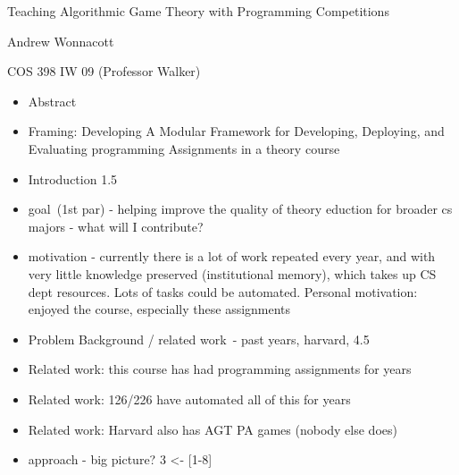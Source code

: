 \documentclass[]{article}
\date{}
\providecommand{\tightlist}{%
  \setlength{\itemsep}{0pt}\setlength{\parskip}{0pt}}
\begin{document}
{Teaching Algorithmic Game Theory with Programming Competitions}

{Andrew Wonnacott}

{COS 398 IW 09 (Professor Walker)}

\begin{itemize}
\tightlist
\item
  {Abstract}
\end{itemize}

\begin{itemize}
\tightlist
\item
  {Framing: Developing A Modular Framework for Developing, Deploying,
  and Evaluating programming Assignments in a theory course}
\end{itemize}

\begin{itemize}
\tightlist
\item
  {Introduction 1.5}
\end{itemize}

\begin{itemize}
\tightlist
\item
  {goal}{~(1st par) - helping improve the quality of theory eduction for
  broader cs majors - what will I contribute?}
\item
  {motivation - currently there is a lot of work repeated every year,
  and with very little knowledge preserved (institutional memory), which
  takes up CS dept resources. Lots of tasks could be automated. Personal
  motivation: enjoyed the course, especially these assignments}
\end{itemize}

\begin{itemize}
\tightlist
\item
  {Problem Background / related work}{~- past years, harvard, 4.5}
\end{itemize}

\begin{itemize}
\tightlist
\item
  {Related work: this course has had programming assignments for years}
\item
  {Related work: 126/226 have automated all of this for years}
\item
  {Related work: Harvard also has AGT PA games (nobody else does)}
\end{itemize}

\begin{itemize}
\tightlist
\item
  {approach - big picture? 3 \textless{}- {[}1-8{]}}
\end{itemize}
\end{document}
